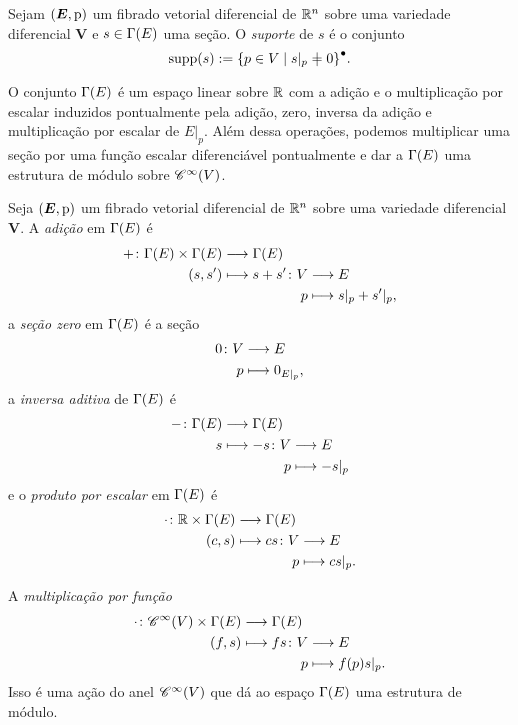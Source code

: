 \begin{definition}
Sejam $(\bm E,\mathrm{p})$ um fibrado vetorial diferencial de $\mathbb{R}^n$ sobre uma variedade diferencial $\bm V$ e $s \in \Gamma(E)$ uma seção. O \emph{suporte} de $s$ é o conjunto
	\begin{equation*}
	\supp (s) := \Fec{\set{p \in V}{s|_p \neq 0}}.
	\end{equation*}
\end{definition}

O conjunto $\Gamma(E)$ é um espaço linear sobre $\mathbb{R}$ com a adição e o multiplicação por escalar induzidos pontualmente pela adição, zero, inversa da adição e multiplicação por escalar de $E|_p$. Além dessa operações, podemos multiplicar uma seção por uma função escalar diferenciável pontualmente e dar a $\Gamma(E)$ uma estrutura de módulo sobre $\mathscr{C}^\infty(V)$.

\begin{definition}
Seja $(\bm E,\mathrm{p})$ um fibrado vetorial diferencial de $\mathbb{R}^n$ sobre uma variedade diferencial $\bm V$. A \emph{adição} em $\Gamma(E)$ é
	\begin{align*}
	\func{+}{\Sec(E) \times \Sec(E)}{\Sec(E)}{(s,s')}{
	\begin{aligned}[t]
	\func{s+s'}{V}{E}{p}{s|_p + s'|_p,}
	\end{aligned}
	}
	\end{align*}
a \emph{seção zero} em $\Gamma(E)$ é a seção
	\begin{align*}
	\func{0}{V}{E}{p}{0_{E|_p}},
	\end{align*}
a \emph{inversa aditiva} de $\Gamma(E)$ é
	\begin{align*}
	\func{-}{\Sec(E)}{\Sec(E)}{s}{
	\begin{aligned}[t]
	\func{-s}{V}{E}{p}{-s|_p}
	\end{aligned}
	}
	\end{align*}
e o \emph{produto por escalar} em $\Gamma(E)$ é
	\begin{align*}
	\func{\cdot}{\R \times \Sec(E)}{\Sec(E)}{(c,s)}{
	\begin{aligned}[t]
	\func{cs}{V}{E}{p}{cs|_p.}
	\end{aligned}
	}
	\end{align*}

A \emph{multiplicação por função}
	\begin{align*}
	\func{\cdot}{\Cont^\infty(V) \times \Sec(E)}{\Sec(E)}{(f,s)}{
		\begin{aligned}[t]
		\func{fs}{V}{E}{p}{f(p)s|_p.}
		\end{aligned}
	}	
	\end{align*}
Isso é uma ação do anel $\mathscr{C}^\infty(V)$ que dá ao espaço $\Gamma(E)$ uma estrutura de módulo.
\end{definition}


